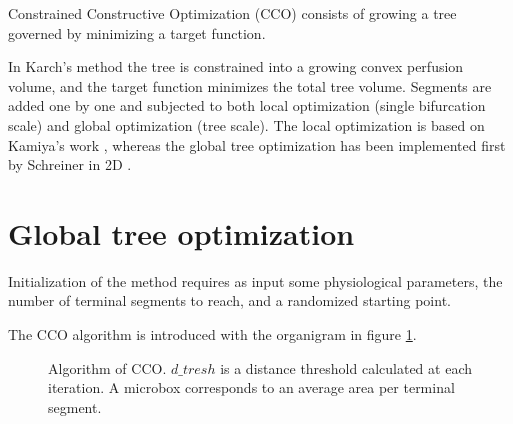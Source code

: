 \documentclass[a4paper, 11pt]{article} %
\begin{document}
Constrained Constructive Optimization (CCO) consists of growing a tree governed by minimizing a target function. 

In Karch's method the tree is constrained into a growing convex perfusion volume, and the target function minimizes the total tree volume. Segments are added one by one and subjected to both local optimization (single bifurcation scale) and global optimization (tree scale). The local optimization is based on Kamiya's work \cite{kamiya1972optimal}, whereas the global tree optimization has been implemented first by Schreiner in 2D \cite{schreiner1993computer}. 

\section{Global tree optimization}

Initialization of the method requires as input some physiological parameters, the number of terminal segments to reach, and a randomized starting point.


The CCO algorithm is introduced with the organigram in figure \ref{fig:algo loop}.
\begin{figure}[htbp]
\centering
{}
\caption{Algorithm of CCO. ${d\_tresh}$ is a distance threshold calculated at each iteration. A microbox corresponds to an average area per terminal segment.}
\label{fig:algo loop}
\end{figure}
\end{document}
